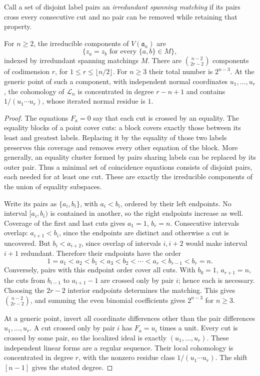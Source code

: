 Call a set of disjoint label pairs an \emph{irredundant
spanning matching} if its pairs cross every consecutive cut
and no pair can be removed while retaining that property.

\begin{theorem}\label{e1f:thm:support}
For \(n\geq2\), the irreducible components of
\(V(\mathfrak a_n)\) are
\[
 \{z_a=z_b\text{ for every }\{a,b\}\in M\},
\]
indexed by irredundant spanning matchings \(M\).
There are \(\binom{n-2}{2r-2}\) components of codimension
\(r\), for \(1\leq r\leq\lfloor n/2\rfloor\).
For \(n\geq3\) their total number is \(2^{n-3}\).
At the generic point of such a component, with independent
normal coordinates \(u_1,\ldots,u_r\), the cohomology of
\(\mathcal L_n\) is concentrated in degree \(r-n+1\)
and contains \(1/(u_1\cdots u_r)\), whose iterated normal
residue is \(1\).
\end{theorem}

\begin{proof}
The equations \(F_a=0\) say that each cut is crossed by
an equality. The equality blocks of a point cover cuts:
a block covers exactly those between its least and greatest
labels. Replacing it by the equality of those two labels
preserves this coverage and removes every other equation
of the block. More generally, an equality cluster formed
by pairs sharing labels can be replaced by its outer pair.
Thus a minimal set of coincidence equations consists of
disjoint pairs, each needed for at least one cut. These are
exactly the irreducible components of the union of equality
subspaces.

Write its pairs as \(\{a_i,b_i\}\), with \(a_i<b_i\),
ordered by their left endpoints. No interval
\([a_i,b_i)\) is contained in another, so the right
endpoints increase as well. Coverage of the first and last
cuts gives \(a_1=1\), \(b_r=n\). Consecutive intervals
overlap: \(a_{i+1}<b_i\), since the endpoints are distinct
and otherwise a cut is uncovered. But
\(b_i<a_{i+2}\), since overlap of intervals \(i,i+2\)
would make interval \(i+1\) redundant. Therefore their
endpoints have the order
\[
 1=a_1<a_2<b_1<a_3<b_2<\cdots
                  <a_r<b_{r-1}<b_r=n.
\]
Conversely, pairs with this endpoint order cover all cuts.
With \(b_0=1\), \(a_{r+1}=n\), the cuts from
\(b_{i-1}\) to \(a_{i+1}-1\) are crossed only by pair
\(i\); hence each is necessary. Choosing the \(2r-2\)
interior endpoints determines the matching. This gives
\(\binom{n-2}{2r-2}\), and summing the even binomial
coefficients gives \(2^{n-3}\) for \(n\geq3\).

At a generic point, invert all coordinate differences other
than the pair differences \(u_1,\ldots,u_r\). A cut crossed
only by pair \(i\) has \(F_a=u_i\) times a unit.
Every cut is crossed by some pair, so the localized ideal
is exactly \((u_1,\ldots,u_r)\). These independent linear
forms are a regular sequence. Their local cohomology is
concentrated in degree \(r\), with the nonzero residue class
\(1/(u_1\cdots u_r)\). The shift \([n-1]\) gives
the stated degree.
\end{proof}

